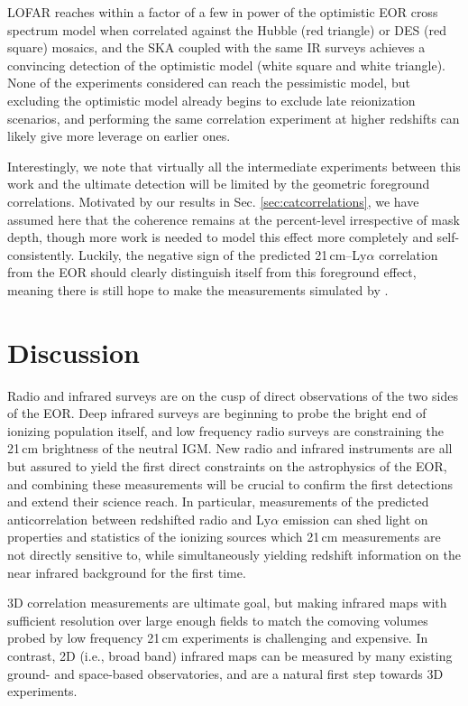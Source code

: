 \documentclass[numberedappendix]{emulateapj}
\begin{document}
LOFAR reaches within a factor of a few in power of the optimistic EOR cross spectrum model when correlated against the Hubble (red triangle) or DES (red square) mosaics, and the SKA coupled with the same IR surveys achieves a convincing detection of the optimistic model (white square and white triangle). None of the experiments considered can reach the pessimistic model, but excluding the optimistic model already begins to exclude late reionization scenarios, and performing the same correlation experiment at higher redshifts can likely give more leverage on earlier ones. 

Interestingly, we note that virtually all the intermediate experiments between this work and the ultimate detection will be limited by the geometric foreground correlations. Motivated by our results in Sec. \ref{sec:catcorrelations}, we have assumed here that the coherence remains at the percent-level irrespective of mask depth, though more work is needed to model this effect more completely and self-consistently. Luckily, the negative sign of the predicted 21\,cm--Ly$\alpha$ correlation from the EOR should clearly distinguish itself from this foreground effect, meaning there is still hope to make the measurements simulated by \citet{mao14,StarsAndReionization}.

\section{Discussion}

Radio and infrared surveys are on the cusp of direct observations of the two sides of the EOR. Deep infrared surveys are beginning to probe the bright end of ionizing population itself, and low frequency radio surveys are constraining the 21\,cm brightness of the neutral IGM. New radio and infrared instruments are all but assured to yield the first direct constraints on the astrophysics of the EOR, and combining these measurements will be crucial to confirm the first detections and extend their science reach. In particular, measurements of the predicted anticorrelation between redshifted radio and Ly$\alpha$ emission can shed light on properties and statistics of the ionizing sources which 21\,cm measurements are not directly sensitive to, while simultaneously yielding redshift information on the near infrared background for the first time. 

3D correlation measurements are ultimate goal, but making infrared maps with sufficient resolution over large enough fields to match the comoving volumes probed by low frequency 21\,cm experiments is challenging and expensive. In contrast, 2D (i.e., broad band) infrared maps can be measured by many existing ground- and space-based observatories, and are a natural first step towards 3D experiments. 
\end{document}
